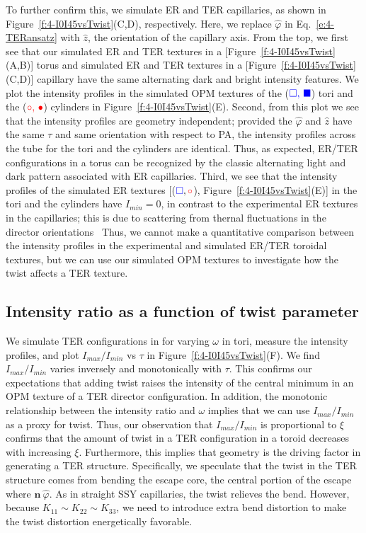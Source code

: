 To further confirm this, we simulate ER and TER capillaries, as shown in Figure~\ref{f:4-I0I45vsTwist}(C,D), respectively.
Here, we replace $\hat{\varphi}$ in Eq.~\ref{e:4-TERansatz} with $\hat{z}$, the orientation of the capillary axis.
From the top, we first see that our simulated ER and TER textures in a [Figure~\ref{f:4-I0I45vsTwist}(A,B)] torus and simulated ER and TER textures in a [Figure~\ref{f:4-I0I45vsTwist}(C,D)] capillary have the same alternating dark and bright intensity features.
We plot the intensity profiles in the simulated OPM textures of the (${\color{blue} \square,\,\blacksquare}$) tori and the (${\color{red} \circ,\,\bullet}$) cylinders in Figure~\ref{f:4-I0I45vsTwist}(E).
Second, from this plot we see that the intensity profiles are geometry independent; provided the $\hat{\varphi}$ and $\hat{z}$ have the same $\tau$ and same orientation with respect to PA, the intensity profiles across the tube for the tori and the cylinders are identical.
Thus, as expected, ER/TER configurations in a torus can be recognized by the classic alternating light and dark pattern associated with ER capillaries.
Third, we see that the intensity profiles of the simulated ER textures [(${\color{blue} \square},{\color{red} \circ}$), Figure~\ref{f:4-I0I45vsTwist}(E)] in the tori and the cylinders have $I_{min} = 0$, in contrast to the experimental ER textures in the capillaries; this is due to scattering from thernal fluctuations in the director orientations~\cite{RN33,RN309}
Thus, we cannot make a quantitative comparison between the intensity profiles in the experimental and simulated ER/TER toroidal textures, but we can use our simulated OPM textures to investigate how the twist affects a TER texture.


\subsection{Intensity ratio as a function of twist parameter}
We simulate TER configurations in for varying $\omega$ in tori, measure the intensity profiles, and plot $I_{max}/I_{min}$ vs $\tau$ in Figure~\ref{f:4-I0I45vsTwist}(F).
We find $I_{max}/I_{min}$ varies inversely and monotonically with $\tau$.
This confirms our expectations that adding twist raises the intensity of the central minimum in an OPM texture of a TER director configuration.
In addition, the monotonic relationship between the intensity ratio and $\omega$ implies that we can use $I_{max}/I_{min}$ as a proxy for twist.
Thus, our observation that  $I_{max}/I_{min}$ is proportional to $\xi$ confirms that the amount of twist in a TER configuration in a toroid decreases with increasing $\xi$.
Furthermore, this implies that geometry is the driving factor in generating a TER structure.
Specifically, we speculate that the twist in the TER structure comes from bending the escape core, the central portion of the escape where $\mathbf{n}~\hat{\varphi}$.
As in straight SSY capillaries, the twist relieves the bend.
However, because $K_{11} \sim K_{22} \sim K_{33}$, we need to introduce extra bend distortion to make the twist distortion energetically favorable.


